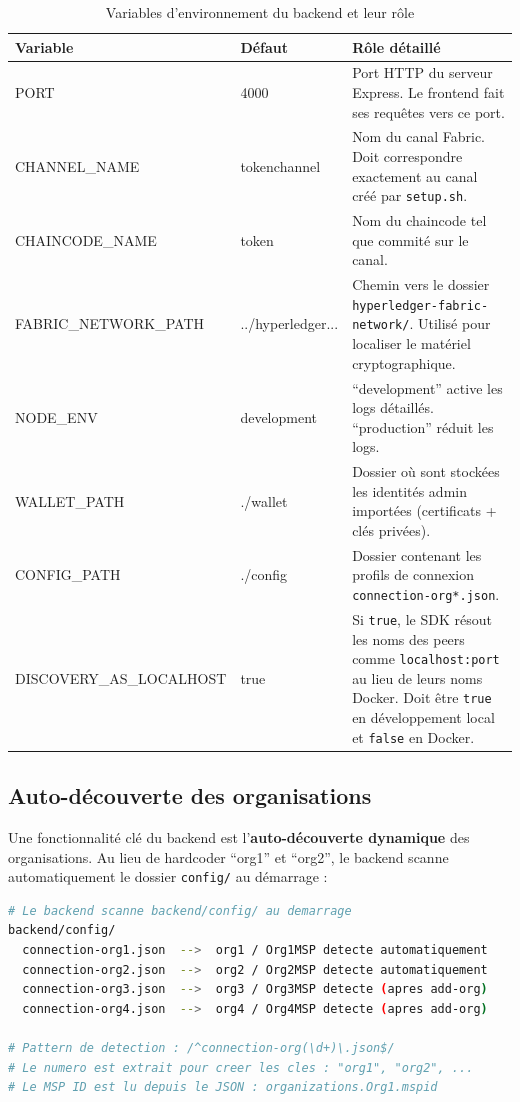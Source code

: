 \documentclass[12pt,a4paper,twoside]{report}
\begin{document}
\begin{table}[H]
\centering
\begin{tabularx}{\textwidth}{llX}
\toprule
\textbf{Variable} & \textbf{Défaut} & \textbf{Rôle détaillé} \\
\midrule
PORT & 4000 & Port HTTP du serveur Express. Le frontend fait ses requêtes vers ce port. \\
CHANNEL\_NAME & tokenchannel & Nom du canal Fabric. Doit correspondre exactement au canal créé par \texttt{setup.sh}. \\
CHAINCODE\_NAME & token & Nom du chaincode tel que commité sur le canal. \\
FABRIC\_NETWORK\_PATH & ../hyperledger... & Chemin vers le dossier \texttt{hyperledger-fabric-network/}. Utilisé pour localiser le matériel cryptographique. \\
NODE\_ENV & development & ``development'' active les logs détaillés. ``production'' réduit les logs. \\
WALLET\_PATH & ./wallet & Dossier où sont stockées les identités admin importées (certificats + clés privées). \\
CONFIG\_PATH & ./config & Dossier contenant les profils de connexion \texttt{connection-org*.json}. \\
DISCOVERY\_AS\_LOCALHOST & true & Si \texttt{true}, le SDK résout les noms des peers comme \texttt{localhost:port} au lieu de leurs noms Docker. Doit être \texttt{true} en développement local et \texttt{false} en Docker. \\
\bottomrule
\end{tabularx}
\caption{Variables d'environnement du backend et leur rôle}
\end{table}

\subsection{Auto-découverte des organisations}

Une fonctionnalité clé du backend est l'\textbf{auto-découverte dynamique} des organisations. Au lieu de hardcoder ``org1'' et ``org2'', le backend scanne automatiquement le dossier \texttt{config/} au démarrage :

\begin{lstlisting}[language=bash, caption=Principe de l'auto-découverte]
# Le backend scanne backend/config/ au demarrage
backend/config/
  connection-org1.json  -->  org1 / Org1MSP detecte automatiquement
  connection-org2.json  -->  org2 / Org2MSP detecte automatiquement
  connection-org3.json  -->  org3 / Org3MSP detecte (apres add-org)
  connection-org4.json  -->  org4 / Org4MSP detecte (apres add-org)
  
# Pattern de detection : /^connection-org(\d+)\.json$/
# Le numero est extrait pour creer les cles : "org1", "org2", ...
# Le MSP ID est lu depuis le JSON : organizations.Org1.mspid
\end{lstlisting}
\end{document}
